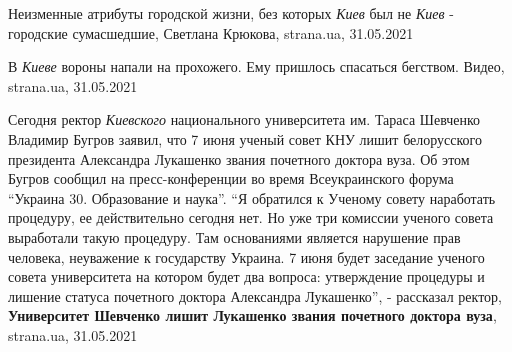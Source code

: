 Неизменные атрибуты городской жизни, без которых \emph{Киев} был не \emph{Киев}
- городские сумасшедшие, Светлана Крюкова, strana.ua, 31.05.2021

В \emph{Киеве} вороны напали на прохожего. Ему пришлось спасаться бегством.
Видео, strana.ua, 31.05.2021

Сегодня ректор \emph{Киевского} национального университета им. Тараса Шевченко
Владимир Бугров заявил, что 7 июня ученый совет КНУ лишит белорусского
президента Александра Лукашенко звания почетного доктора вуза.  Об этом Бугров
сообщил на пресс-конференции во время Всеукраинского форума \enquote{Украина
30.  Образование и наука}. \enquote{Я обратился к Ученому совету наработать
процедуру, ее действительно сегодня нет. Но уже три комиссии ученого совета
выработали такую процедуру. Там основаниями является нарушение прав человека,
неуважение к государству Украина. 7 июня будет заседание ученого совета
университета на котором будет два вопроса: утверждение процедуры и лишение
статуса почетного доктора Александра Лукашенко}, - рассказал ректор,
\textbf{Университет Шевченко лишит Лукашенко звания почетного доктора вуза},
strana.ua, 31.05.2021
